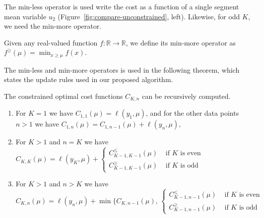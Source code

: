 \documentclass[twoside,11pt]{article}
\newcommand{\RR}{\mathbb R}
\begin{document}
The min-less operator is used write the cost as a function of a single
segment mean variable $u_2$ (Figure~\ref{fig:compare-unconstrained},
left). Likewise, for odd $K$, we need the min-more operator.
\begin{definition}
\label{def:min-more}
  Given any real-valued function $f:\RR\rightarrow\RR$, we define its min-more
  operator as $f^\geq(\mu)=\min_{x\geq \mu} f(x)$.
\end{definition}
The min-less and min-more operators is used in the following
theorem, which states the update rules used in our proposed algorithm.

\begin{theorem}
\label{thm:gpdpa}
  The constrained optimal cost functions $C_{K,n}$ can be recursively computed.
\begin{enumerate}
\item For $K=1$ we have
$C_{1,1}(\mu)=\ell(y_1,\mu)$, and for the other data
  points $n>1$ we have
$
C_{1,n}(\mu)=C_{1,n-1}(\mu)+\ell(y_n,\mu),
$
\item For $K>1$ and $n=K$ we have
$
  C_{K,K}(\mu)=\ell(y_K, \mu)+
  \begin{cases}
    C_{K-1,K-1}^\leq(\mu) & \text{ if $K$ is even}\\
    C_{K-1,K-1}^\geq(\mu) & \text{ if $K$ is odd} 
  \end{cases}
$
\item For $K>1$ and $n>K$ we have
 $$
  C_{K,n}(\mu)=\ell(y_n,\mu)+\min\{
C_{K,n-1}(\mu),\,
  \begin{cases}
C_{K-1,n-1}^\leq(\mu)
   & \text{ if $K$ is even}\\
  C_{K-1,n-1}^\geq(\mu)
   & \text{ if $K$ is odd}
  \end{cases}
$$
\end{enumerate}
\end{theorem}
\end{document}
